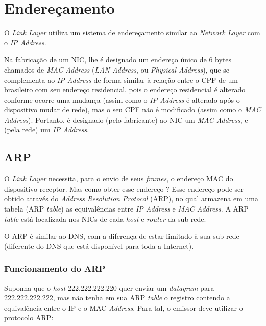 \hypertarget{endereuxe7amento-o-switches}{%
\section{Endereçamento}\label{endereuxe7amento-o-switches}}

O \emph{Link Layer} utiliza um sistema de endereçamento similar ao
\emph{Network Layer} com o \emph{IP Address}.

Na fabricação de um NIC, lhe é designado um endereço único de 6 bytes
chamados de \emph{MAC Address} (\emph{LAN Address}, ou \emph{Physical
Address}), que se complementa ao \emph{IP Address} de forma similar à
relação entre o CPF de um brasileiro com seu endereço residencial, pois
o endereço residencial é alterado conforme ocorre uma mudança (assim
como o \emph{IP Address} é alterado após o dispositivo mudar de rede),
mas o seu CPF não é modificado (assim como o \emph{MAC Address}).
Portanto, é designado (pelo fabricante) ao NIC um \emph{MAC Address}, e
(pela rede) um \emph{IP Address}.

\hypertarget{arp}{%
\subsection{ARP}\label{arp}}

O \emph{Link Layer} necessita, para o envio de seus \emph{frames}, o
endereço MAC do dispositivo receptor. Mas como obter esse endereço ?
Esse endereço pode ser obtido através do \emph{Address Resolution
Protocol} (ARP), no qual armazena em uma tabela (ARP \emph{table}) as
equivalências entre \emph{IP Address} e \emph{MAC Address}. A ARP
\emph{table} está localizada nos NICs de cada \emph{host} e
\emph{router} da sub-rede.

O ARP é similar ao DNS, com a diferença de estar limitado à sua sub-rede
(diferente do DNS que está disponível para toda a Internet).

\hypertarget{funcionamento-do-arp}{%
\subsubsection{Funcionamento do ARP}\label{funcionamento-do-arp}}

Suponha que o \emph{host} 222.222.222.220 quer enviar um \emph{datagram}
para 222.222.222.222, mas não tenha em sua ARP \emph{table} o registro
contendo a equivalência entre o IP e o MAC \emph{Address}. Para tal, o
emissor deve utilizar o protocolo ARP:

